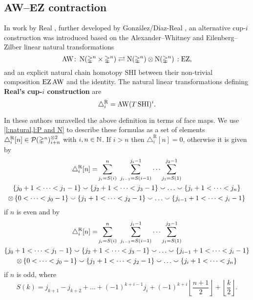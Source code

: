 \subsection{AW--EZ contraction} \label{ss:real}

In work by Real \cite{real1996computability}, further developed by Gonz\'alez\-/D\'iaz\--Real \cite{gonzalez-diaz1999steenrod, gonzalez2003computation, gonzalez-diaz2005cocyclic},
an alternative \mbox{cup-$i$} construction was introduced based on the Alexander--Whitney and Eilenberg--Zilber linear natural transformations
\[
\operatorname{AW} \colon \operatorname{N}(\mathbb{\Delta}^n \times \mathbb{\Delta}^n)
\rightleftarrows
\operatorname{N}(\mathbb{\Delta}^n) \otimes \operatorname{N}(\mathbb{\Delta}^n) \,: \operatorname{EZ},
\]
and an explicit natural chain homotopy $\mathrm{SHI}$ between their non-trivial composition $\operatorname{EZ} \operatorname{AW}$ and the identity.
The natural linear transformations defining \textbf{Real's \mbox{cup-$i$} construction} are
\[
\triangle^{\mathrm{R}}_i = \operatorname{AW} (T \, \mathrm{SHI})^i.
\]

In \cite[Corollary 3.2]{gonzalez-diaz1999steenrod} these authors unravelled the above definition in terms of face maps.
We use \cref{l:natural,l:P and N} to describe these formulas as a set of elements $\triangle_i^{\mathrm{R}} [n] \in \mathcal{P}(\mathbb{\Delta}^n)^{\otimes 2}_{i+n}$ with $i,n \in \mathbb{N}$.
If $i > n$ then $\triangle_i^{\mathrm{R}} [n] = 0$, otherwise it is given by
\begin{multline*}
\triangle^{\mathrm{R}}_i [n] = \!
\sum_{j_i=S(i)}^{n} \ \sum_{j_{i-1}=S(i-1)}^{j_i-1} \dots \sum_{j_1=S(1)}^{j_2-1} \\
\{j_0+1 < \dots < j_1-1\} \union \{j_2+1 < \dots < j_3-1\} \union \dots \union \{j_i+1 < \dots < j_n\} \\ \ot \,
\{0 < \dots < j_0-1\} \union \{j_1+1 < \dots < j_2-1\} \union \dots \union \{j_{i-1}+1 < \dots < j_i-1\}
\end{multline*}
if $n$ is even and by
\begin{multline*}
\triangle^{\mathrm{R}}_i [n] = \!
\sum_{j_i=S(i)}^{n} \ \sum_{j_{i-1}=S(i-1)}^{j_i-1} \dots \sum_{j_1=S(1)}^{j_2-1} \\
\{j_0+1 < \dots < j_1-1\} \union \{j_2+1 < \dots < j_3-1\} \union \dots \union \{j_{i-1}+1 < \dots < j_i-1\} \\ \ot \,
\{0 < \dots < j_0-1\} \union \{j_1+1 < \dots < j_2-1\} \union \dots \union \{j_i+1 < \dots < j_n\}
\end{multline*}
if $n$ is odd, where
\[
S(k) = j_{k+1} - j_{k+2} + \dots + (-1)^{k+i-1} j_i + (-1)^{k+i} \left\lfloor \frac{n+1}{2} \right\rfloor + \left\lfloor \frac{k}{2} \right\rfloor .
\]

